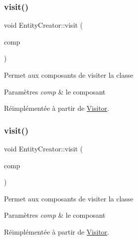 \subsubsection{\texorpdfstring{visit()}{visit()}\hspace{0.1cm}{\footnotesize\ttfamily [2/5]}}
{\footnotesize\ttfamily void Entity\+Creator\+::visit (\begin{DoxyParamCaption}\item[{\hyperlink{structHealthComponent}{Health\+Component} \&}]{comp }\end{DoxyParamCaption})\hspace{0.3cm}{\ttfamily [virtual]}}

Permet aux composants de visiter la classe


\begin{DoxyParams}{Paramètres}
{\em comp} & le composant \\
\hline
\end{DoxyParams}


Réimplémentée à partir de \hyperlink{classVisitor_aba8f1cab6bd85c2b86ed0b8103d30f45}{Visitor}.

\mbox{\label{classEntityCreator_a48a6a070dee113ccf56916c0077845c1}} 
\subsubsection{\texorpdfstring{visit()}{visit()}\hspace{0.1cm}{\footnotesize\ttfamily [3/5]}}
{\footnotesize\ttfamily void Entity\+Creator\+::visit (\begin{DoxyParamCaption}\item[{\hyperlink{structAttackComponent}{Attack\+Component} \&}]{comp }\end{DoxyParamCaption})\hspace{0.3cm}{\ttfamily [virtual]}}

Permet aux composants de visiter la classe


\begin{DoxyParams}{Paramètres}
{\em comp} & le composant \\
\hline
\end{DoxyParams}


Réimplémentée à partir de \hyperlink{classVisitor_a6bcc6c971d8ba324024e3cf8e06e3751}{Visitor}.

\mbox{\label{classEntityCreator_af23e7656c8ee20319bd890aad99a6996}} 
